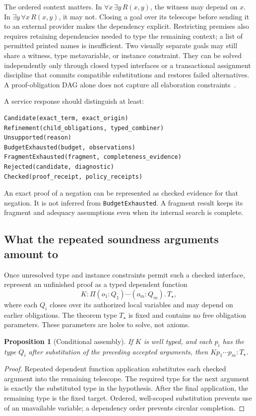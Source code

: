 \documentclass[11pt,letterpaper]{article}
\newcommand{\code}[1]{\nolinkurl{#1}}
\newtheorem{proposition}{Proposition}
\begin{document}
The ordered context matters. In \(\forall x\,\exists y\,R(x,y)\), the witness may
depend on \(x\). In \(\exists y\,\forall x\,R(x,y)\), it may not. Closing a goal
over its telescope before sending it to an external provider makes the dependency
explicit. Restricting premises also requires retaining dependencies needed to
type the remaining context; a list of permitted printed names is insufficient.
Two visually separate goals may still share a witness, type metavariable, or
instance constraint. They can be solved independently only through closed typed
interfaces or a transactional assignment discipline that commits compatible
substitutions and restores failed alternatives. A proof-obligation DAG alone
 does not capture all elaboration constraints~\cite[\S8.3]{loom}\cite[\S9.6]{contour}.

A service response should distinguish at least:
\begin{lstlisting}
Candidate(exact_term, exact_origin)
Refinement(child_obligations, typed_combiner)
Unsupported(reason)
BudgetExhausted(budget, observations)
FragmentExhausted(fragment, completeness_evidence)
Rejected(candidate, diagnostic)
Checked(proof_receipt, policy_receipts)
\end{lstlisting}
An exact proof of a negation can be represented as checked evidence for that
negation. It is not inferred from \code{BudgetExhausted}. A fragment result keeps
its fragment and adequacy assumptions even when its internal search is complete.

\subsection{What the repeated soundness arguments amount to}
Once unresolved type and instance constraints permit such a checked interface,
represent an unfinished proof as a typed dependent function
\[
 K : \Pi(o_1:Q_1)\cdots(o_m:Q_m).\,T_\star,
\]
where each \(Q_i\) closes over its authorized local variables and may depend on
earlier obligations. The theorem type \(T_\star\) is fixed and contains no free
obligation parameters. These parameters are holes to solve, not axioms.

\begin{proposition}[Conditional assembly]
If \(K\) is well typed, and each \(p_i\) has the type \(Q_i\) after substitution
of the preceding accepted arguments, then \(Kp_1\cdots p_m:T_\star\).
\end{proposition}
\begin{proof}
Repeated dependent function application substitutes each checked argument into
the remaining telescope. The required type for the next argument is exactly the
substituted type in the hypothesis. After the final application, the remaining
type is the fixed target. Ordered, well-scoped substitution prevents use of an
unavailable variable; a dependency order prevents circular completion.
\end{proof}
\end{document}
